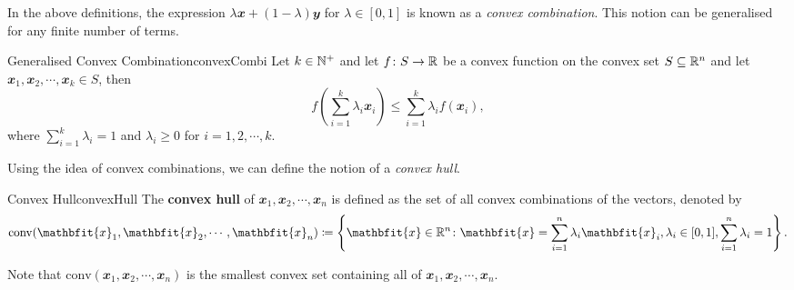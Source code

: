 \documentclass[math, code]{amznotes}
\theoremstyle{remark}
\begin{document}
In the above definitions, the expression $\lambda\mathbfit{x} + (1 - \lambda)\mathbfit{y}$ for $\lambda \in [0, 1]$ is known as a \textit{convex combination}. This notion can be generalised for any finite number of terms.
\begin{probox}{Generalised Convex Combination}{convexCombi}
    Let $k \in \mathbb{N}^+$ and let $f \colon S \to \mathbb{R}$ be a convex function on the convex set $S \subseteq \mathbb{R}^n$ and let $\mathbfit{x}_1, \mathbfit{x}_2, \cdots, \mathbfit{x}_k \in S$, then 
    \begin{equation*}       
        f\left(\sum_{i = 1}^{k}\lambda_i\mathbfit{x}_i\right) \leq \sum_{i = 1}^{k}\lambda_i f(\mathbfit{x}_i),
    \end{equation*}     
    where $\sum_{i = 1}^{k}\lambda_i = 1$ and $\lambda_i \geq 0$ for $i = 1, 2, \cdots, k$.
\end{probox}
Using the idea of convex combinations, we can define the notion of a \textit{convex hull}.
\begin{dfnbox}{Convex Hull}{convexHull}
    The {\color{red} \textbf{convex hull}} of $\mathbfit{x}_1, \mathbfit{x}_2, \cdots, \mathbfit{x}_n$ is defined as the set of all convex combinations of the vectors, denoted by
    \begin{equation*}
        \mathrm{conv}(\mathbfit{x}_1, \mathbfit{x}_2, \cdots, \mathbfit{x}_n) \coloneqq \left\{\mathbfit{x} \in \R^n \colon \mathbfit{x} = \sum_{i = 1}^{n}\lambda_i\mathbfit{x}_i, \lambda_i \in [0, 1], \sum_{i = 1}^{n}\lambda_i = 1\right\}.
    \end{equation*}
\end{dfnbox}
Note that $\mathrm{conv}(\mathbfit{x}_1, \mathbfit{x}_2, \cdots, \mathbfit{x}_n)$ is the smallest convex set containing all of $\mathbfit{x}_1, \mathbfit{x}_2, \cdots, \mathbfit{x}_n$.
\end{document}
